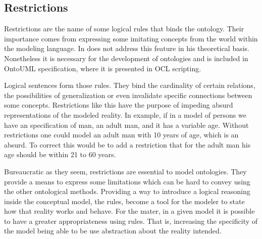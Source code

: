 \subsection{Restrictions}

Restrictions are the name of some logical rules that binds the ontology. Their importance comes from expressing some imitating concepts from the world within the modeling language. In \cite{guizzardi_ontological_2005} does not address this feature in his theoretical basis. Nonetheless it is necessary for the development of ontologies and is included in OntoUML specification, where it is presented in OCL scripting. \citep{guizzardi_ontoUML_2004}

Logical sentences form those rules. They bind the cardinality of certain relations, the possibilities of generalization or even invalidate specific connections between some concepts. Restrictions like this have the purpose of impeding absurd representations of the modeled reality. In example, if in a model of persons we have an specification of man, an adult man, and it has a variable age. Without restrictions one could model an adult man with 10 years of age, which is an absurd. To correct this would be to add a restriction that for the adult man his age should be within 21 to 60 years.

Bureaucratic as they seem, restrictions are essential to model ontologies. They provide a means to express some limitations which can be hard to convey using the other ontological methods. Providing a way to introduce a logical reasoning inside the conceptual model, the rules, become a tool for the modeler to state how that reality works and behave. For the mater, in a given model it is possible to have a greater appropriateness using rules. That is, increasing the specificity of the model being able to be use abstraction about the reality intended.